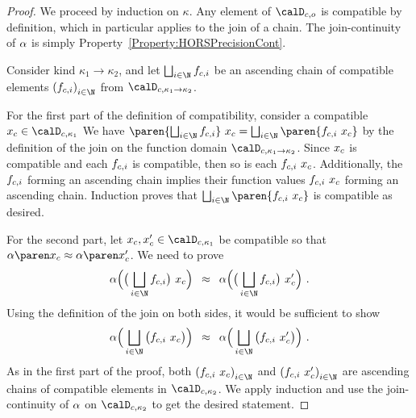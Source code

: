 \documentclass[../../diss.tex]{subfiles}
\begin{document}
\begin{proof}
    We proceed by induction on $\kappa$.
    Any element of $\domainc{\ground}$ is compatible by definition, which in particular applies to the join of a chain.
    The join-continuity of $\abs$ is simply Property~{\ref{Property:HORSPrecisionCont}}.

    Consider kind $\kappa_1 \to \kappa_2$, and let $\bigsqcup_{i \in \N} \fci$ be an ascending chain of compatible elements ${(\fci)}_{i \in \N}$ from $\domainc{\kappa_1 \to \kappa_2}$.

    For the first part of the definition of compatibility, consider a compatible $\xc \in \domainc{\kappa_1}$
    We have
    \(
        \paren{ \bigsqcup_{i \in \N} \fci } \appl \xc
        =
        \bigsqcup_{i \in \N} \paren{\fci \appl \xc}
    \)
    by the definition of the join on the function domain $\domainc{\kappa_1 \to \kappa_2}$.
    Since $x_c$ is compatible and each $f_{c,i}$ is compatible, then so is each $f_{c,i} \  x_c$.
    Additionally, the $f_{c,i}$ forming an ascending chain implies their function values $f_{c,i} \  x_c$ forming an ascending chain.
    Induction proves that $\bigsqcup_{i \in \N} \paren{\fci \appl \xc}$ is compatible as desired.

    For the second part, let $\xc, \xc' \in \domainc{\kappa_1}$ be compatible so that $\abs{\xc} \approx \abs{\xc'}$.
    We need to prove
    \[
        \abs \Big( \big( \bigsqcup_{i \in \N} \fci \big) \appl \xc \Big)
        \enspace
        \approx
        \enspace
        \abs \Big( \big( \bigsqcup_{i \in \N} \fci \big) \appl \xc' \Big)
        \ .
    \]
    Using the definition of the join on both sides, it would be sufficient to show
    \[
        \abs \Big( \bigsqcup_{i \in \N} \big(  \fci \appl \xc  \big) \Big)
        \enspace
        \approx
        \enspace
        \abs \Big( \bigsqcup_{i \in \N} \big(  \fci  \appl \xc' \big) \Big)
        \ .
    \]
    As in the first part of the proof, both ${(\fci \appl \xc)}_{i \in \N}$ and ${(\fci \appl \xc')}_{i \in \N}$ are ascending chains of compatible elements in $\domainc{\kappa_2}$.
    We apply induction and use the join-continuity of $\abs$ on $\domainc{\kappa_2}$ to get the desired statement.


\end{proof}
\end{document}
